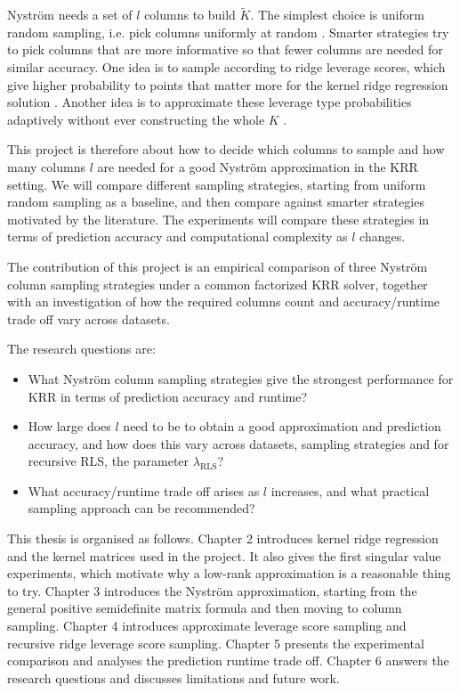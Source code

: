 Nystr\"om needs a set of $l$ columns to build $\tilde K$. The simplest choice is uniform random sampling, i.e. pick columns uniformly at random \citep{kumar2012sampling,gittens2016revisiting}. Smarter strategies try to pick columns that are more informative so that fewer columns are needed for similar accuracy. One idea is to sample according to ridge leverage scores, which give higher probability to points that matter more for the kernel ridge regression solution \citep{alaoui2015fast}. Another idea is to approximate these leverage type probabilities adaptively without ever constructing the whole $K$ \citep{calandriello2017distributed}.

This project is therefore about how to decide which columns to sample and how many columns $l$ are needed for a good Nystr\"om approximation in the KRR setting. We will compare different sampling strategies, starting from uniform random sampling as a baseline, and then compare against smarter strategies motivated by the literature. The experiments will compare these strategies in terms of prediction accuracy and computational complexity as $l$ changes.

The contribution of this project is an empirical comparison of three Nystr\"om column sampling strategies under a common factorized KRR solver, together with an investigation of how the required columns count and accuracy/runtime trade off vary across datasets.

The research questions are:
\begin{itemize}
\item What Nystr\"om column sampling strategies give the strongest performance for KRR in terms of prediction accuracy and runtime?
\item How large does $l$ need to be to obtain a good approximation and prediction accuracy, and how does this vary across datasets, sampling strategies and for recursive RLS, the parameter $\lambda_{\mathrm{RLS}}$?
\item What accuracy/runtime trade off arises as $l$ increases, and what practical sampling approach can be recommended?
\end{itemize}

This thesis is organised as follows. Chapter 2 introduces kernel ridge regression and the kernel matrices used in the project. It also gives the first singular value experiments, which motivate why a low-rank approximation is a reasonable thing to try. Chapter 3 introduces the Nystr\"om approximation, starting from the general positive semidefinite matrix formula and then moving to column sampling. Chapter 4 introduces approximate leverage score sampling and recursive ridge leverage score sampling. Chapter 5 presents the experimental comparison and analyses the prediction runtime trade off. Chapter 6 answers the research questions and discusses limitations and future work.